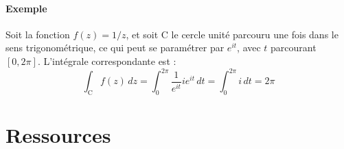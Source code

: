 \documentclass[a4paper]{book}
\begin{document}
\subsection{Exemple}
Soit la fonction $f(z) = 1/z$, et soit $\mathrm{C}$ le cercle unité parcouru une fois dans le
sens trigonométrique, ce qui peut se paramétrer par $e^{it}$, avec $t$
parcourant $[0,2\pi]$. L'intégrale correspondante est :
\begin{equation}
	\int_{\mathrm{C}} f(z) \, dz = \int_{0}^{2\pi} \frac{1}{e^{it}} i e^{it}
	\, dt = \int_{0}^{2\pi} i \, dt = 2\pi
\end{equation}

\part{Ressources}
\end{document}
